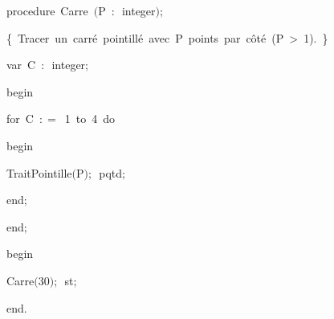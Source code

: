 {\pagebreak[3] 
\vspace{\neglskip}\mbox{\blc  \blk\idt  \mcl procedure\idt \ Carre\ $($P\ $:$\ integer$)$$;$}\par 
\vspace{\neglskip}\mbox{\blc  \blk\blk\idt  \cmt  \{\ Tracer\ un\ carré\ pointillé\ avec\ P\ points\ par\ côté\ (P\ >\ 1).\ \}\idt }\par 
\pagebreak[3] 
\vspace{\neglskip}\mbox{\blc  \blk\blk\idt  \mcl var\idt \ C\ $:$\ integer$;$}\par 
\vspace{\neglskip}\mbox{\blc  \blk\idt  \mcl begin\idt }\par 
\pagebreak[3] 
\vspace{\neglskip}\mbox{\blc  \blk\blk\idt  \mcl for\idt \ C\ $:$$=$\ 1\ \mcl to\idt \ 4\ \mcl do\idt \ }\par 
\vspace{\neglskip}\mbox{\blc  \blk\blk\blk\idt  \mcl begin\idt }\par 
\vspace{\neglskip}\mbox{\blc  \blk\blk\blk\blk\idt  TraitPointille$($P$)$$;$\ pqtd$;$}\par 
\vspace{\neglskip}\mbox{\blc  \blk\blk\blk\idt  \mcl end\idt $;$}\par 
\vspace{\neglskip}\mbox{\blc  \blk\idt  \mcl end\idt $;$}\par 
\medskip

\vspace{\neglskip}\mbox{\blc  \idt  \mcl begin\idt }\par 
\vspace{\neglskip}\mbox{\blc  \blk\idt  Carre$($30$)$$;$\ st$;$}\par 
\vspace{\neglskip}\mbox{\blc  \idt  \mcl end\idt $.$}\par 

\medskip }

